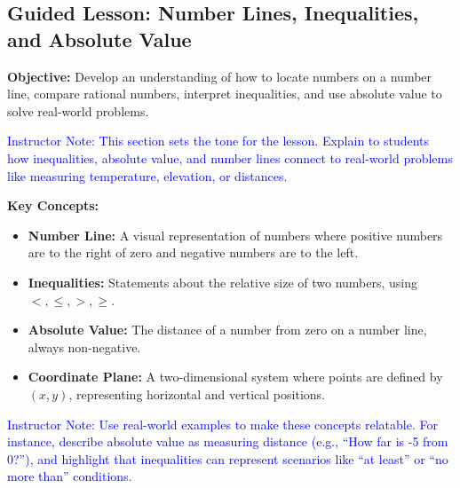 \documentclass[12pt]{article}
\title{}
\date{}
\begin{document}
\subsection*{Guided Lesson: Number Lines, Inequalities, and Absolute Value}
\onehalfspacing

\begin{tcolorbox}[colframe=black!40, colback=gray!5, 
coltitle=black, colbacktitle=black!20, fonttitle=\bfseries\Large, 
title=Learning Objective, halign title=center, left=5pt, right=5pt, top=5pt, bottom=15pt]
\textbf{Objective:} Develop an understanding of how to locate numbers on a number line, compare rational numbers, interpret inequalities, and use absolute value to solve real-world problems.

\textcolor{blue}{Instructor Note: This section sets the tone for the lesson. Explain to students how inequalities, absolute value, and number lines connect to real-world problems like measuring temperature, elevation, or distances.}
\end{tcolorbox}

\begin{tcolorbox}[colframe=black!60, colback=white, 
coltitle=black, colbacktitle=black!15, fonttitle=\bfseries\Large, 
title=Key Concepts and Vocabulary, halign title=center, left=10pt, right=10pt, top=10pt, bottom=15pt]
\textbf{Key Concepts:}
\begin{itemize}
    \item \textbf{Number Line:} A visual representation of numbers where positive numbers are to the right of zero and negative numbers are to the left.
    \item \textbf{Inequalities:} Statements about the relative size of two numbers, using \( <, \leq, >, \geq \).
    \item \textbf{Absolute Value:} The distance of a number from zero on a number line, always non-negative.
    \item \textbf{Coordinate Plane:} A two-dimensional system where points are defined by \( (x, y) \), representing horizontal and vertical positions.
\end{itemize}

\textcolor{blue}{Instructor Note: Use real-world examples to make these concepts relatable. For instance, describe absolute value as measuring distance (e.g., “How far is -5 from 0?”), and highlight that inequalities can represent scenarios like “at least” or “no more than” conditions.}
\end{tcolorbox}
\end{document}
